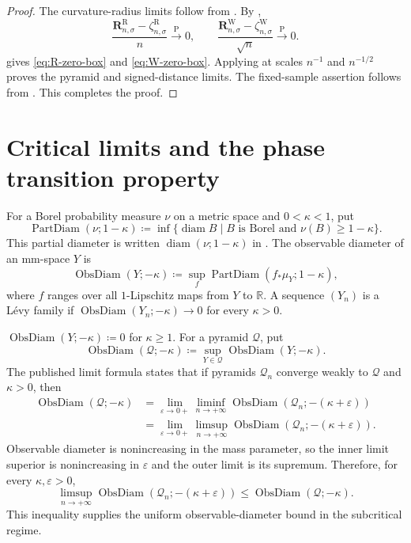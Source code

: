 \documentclass{amsart}
\numberwithin{equation}{section}
\theoremstyle{plain}
\theoremstyle{definition}
\theoremstyle{remark}
\newcommand{\R}{\mathbb{R}}
\newcommand{\eps}{\varepsilon}
\DeclareMathOperator{\diam}{diam}
\DeclareMathOperator{\PartDiam}{PartDiam}
\DeclareMathOperator{\ObsDiam}{ObsDiam}
\begin{document}
\begin{proof}
	The curvature-radius limits follow from
	.  By
	,
	\[
		\frac{\mathbf R^{\mathrm R}_{n,\sigma}
		-\zeta^{\mathrm R}_{n,\sigma}}n
		\overset{\mathrm P}{\longrightarrow}0,
		\qquad
		\frac{\mathbf R^{\mathrm W}_{n,\sigma}
		-\zeta^{\mathrm W}_{n,\sigma}}{\sqrt n}
		\overset{\mathrm P}{\longrightarrow}0.
	\]
	 gives \eqref{eq:R-zero-box} and
	\eqref{eq:W-zero-box}.  Applying  at scales $n^{-1}$ and
	$n^{-1/2}$ proves the pyramid and signed-distance limits.  The
	fixed-sample assertion follows from .
	This completes the proof.
\end{proof}

\section{Critical limits and the phase transition property}
\label{sec:critical-limits}

For a Borel probability measure $\nu$ on a metric space and
$0<\kappa<1$, put
\[ \PartDiam(\nu;1-\kappa) \coloneqq \inf\{\diam B\mid B\text{ is Borel and }\nu(B)\ge1-\kappa\}. \]
This partial diameter is written $\operatorname{diam}(\nu;1-\kappa)$ in
\cite{shioya2016mmg}.  The observable diameter of an mm-space $Y$ is
\[ \ObsDiam(Y;-\kappa) \coloneqq \sup_f\PartDiam(f_*\mu_Y;1-\kappa), \]
where $f$ ranges over all $1$-Lipschitz maps from $Y$ to $\R$.  A sequence
$(Y_n)$ is a L\'evy family if
$\ObsDiam(Y_n;-\kappa)\to0$ for every $\kappa>0$.

$\ObsDiam(Y;-\kappa)\coloneqq0$ for $\kappa\ge1$.  For a pyramid
$\mathcal Q$, put
\[ \ObsDiam(\mathcal Q;-\kappa) \coloneqq \sup_{Y\in\mathcal Q}\ObsDiam(Y;-\kappa). \]
The published limit formula \cite[Theorem~1.1]{yokota2024obsdiam} states
that if pyramids $\mathcal Q_n$ converge weakly to $\mathcal Q$ and
$\kappa>0$, then
\[
\begin{aligned}
	\ObsDiam(\mathcal Q;-\kappa)
	&=\lim_{\eps\to0+}\liminf_{n\to+\infty}\ObsDiam(\mathcal Q_n;-(\kappa+\eps))\\
	&=\lim_{\eps\to0+}\limsup_{n\to+\infty}\ObsDiam(\mathcal Q_n;-(\kappa+\eps)).
\end{aligned}
\]
Observable diameter is nonincreasing in the mass parameter, so the inner
limit superior is nonincreasing in $\eps$ and the outer limit is its
supremum.  Therefore, for every $\kappa,\eps>0$,
\[ \limsup_{n\to+\infty}\ObsDiam(\mathcal Q_n;-(\kappa+\eps)) \le\ObsDiam(\mathcal Q;-\kappa). \]
This inequality supplies the uniform observable-diameter bound in the
subcritical regime.
\end{document}

